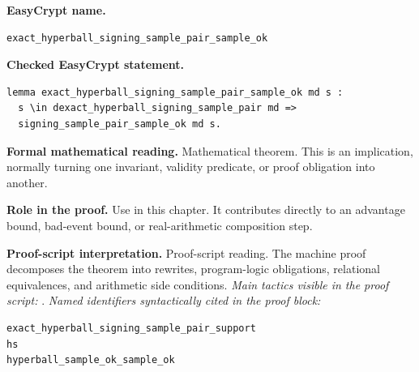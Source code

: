 \begin{formaltheorem}
\noindent\textbf{EasyCrypt name.}
\begin{lstlisting}[language=EasyCrypt,basicstyle=\ttfamily\scriptsize]
exact_hyperball_signing_sample_pair_sample_ok
\end{lstlisting}
\noindent\textbf{Checked EasyCrypt statement.}
\begin{lstlisting}[language=EasyCrypt,basicstyle=\ttfamily\scriptsize]
lemma exact_hyperball_signing_sample_pair_sample_ok md s :
  s \in dexact_hyperball_signing_sample_pair md =>
  signing_sample_pair_sample_ok md s.
\end{lstlisting}
\noindent\textbf{Formal mathematical reading.}
Mathematical theorem. This is an implication, normally turning one invariant, validity predicate, or proof obligation into another.

\noindent\textbf{Role in the proof.}
Use in this chapter. It contributes directly to an advantage bound, bad-event bound, or real-arithmetic composition step.

\noindent\textbf{Proof-script interpretation.}
Proof-script reading. The machine proof decomposes the theorem into rewrites, program-logic obligations, relational equivalences, and arithmetic side conditions.
\emph{Main tactics visible in the proof script:} .
\emph{Named identifiers syntactically cited in the proof block:}
\begin{lstlisting}[language=EasyCrypt,basicstyle=\ttfamily\scriptsize]
exact_hyperball_signing_sample_pair_support
hs
hyperball_sample_ok_sample_ok
\end{lstlisting}

\end{formaltheorem}

